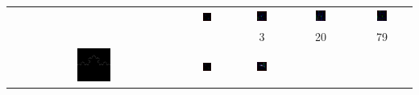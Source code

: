 \documentclass[10pt,a4paper,oneside]{article}
\theoremstyle{definition}
\begin{document}
\begin{table}[p]
\begin{tabular}{c c c c c}
& 
    \includegraphics[width=0.2\textwidth]{../img/runs2d/sierpinskioff/generation0000.png}
& 
    \includegraphics[width=0.2\textwidth]{../img/runs2d/sierpinskioff/generation0003.png}
& 
    \includegraphics[width=0.2\textwidth]{../img/runs2d/sierpinskioff/generation0020.png}
& 
    \includegraphics[width=0.2\textwidth]{../img/runs2d/sierpinskioff/generation0079.png}
\\    
 &  & 3 & 20 & 79 \\
	\includegraphics[width=0.2\textwidth]{../img/runs2d/koch2/data.png}
& 
    \includegraphics[width=0.2\textwidth]{../img/runs2d/koch2/generation0000.png}
& 
    \includegraphics[width=0.2\textwidth]{../img/runs2d/koch2/generation0008.png}

\end{tabular}
\end{table}
\end{document}
